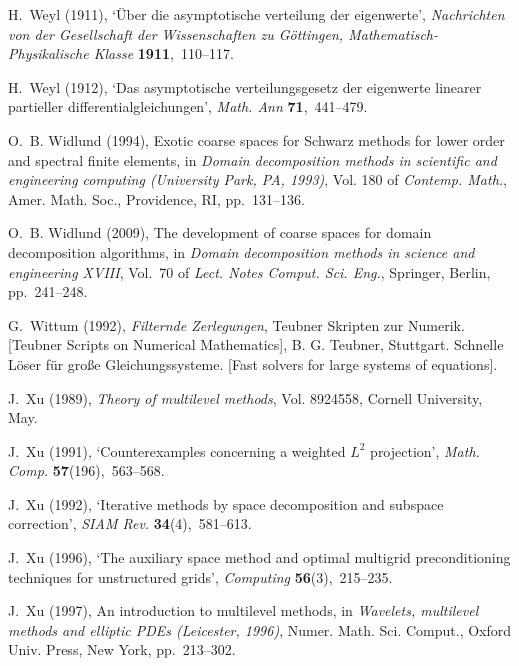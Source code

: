 \documentclass[12pt]{acta_2011xz}
\begin{document}
\begin{thebibliography}{xx}
H.~Weyl  (1911), `\"{U}ber die asymptotische verteilung der eigenwerte', {\em
  Nachrichten von der Gesellschaft der Wissenschaften zu G\"{o}ttingen,
  Mathematisch-Physikalische Klasse} {\bf 1911},~110--117.

H.~Weyl  (1912), `Das asymptotische verteilungsgesetz der eigenwerte linearer
  partieller differentialgleichungen', {\em Math. Ann} {\bf 71},~441--479.

O.~B. Widlund  (1994), Exotic coarse spaces for {S}chwarz methods for lower
  order and spectral finite elements, in {\em Domain decomposition methods in
  scientific and engineering computing ({U}niversity {P}ark, {PA}, 1993)}, Vol.
  180 of {\em Contemp. Math.}, Amer. Math. Soc., Providence, RI, pp.~131--136.

O.~B. Widlund  (2009), The development of coarse spaces for domain
  decomposition algorithms, in {\em Domain decomposition methods in science and
  engineering {XVIII}}, Vol.~70 of {\em Lect. Notes Comput. Sci. Eng.},
  Springer, Berlin, pp.~241--248.

G.~Wittum  (1992), {\em Filternde {Z}erlegungen}, Teubner Skripten zur Numerik.
  [Teubner Scripts on Numerical Mathematics], B. G. Teubner, Stuttgart.
\newblock Schnelle L{\"{o}}ser f{\"{u}}r gro{\ss}e Gleichungssysteme. [Fast solvers
  for large systems of equations].

J.~Xu  (1989), {\em Theory of multilevel methods}, Vol. 8924558, Cornell
  University, May.

J.~Xu  (1991), `Counterexamples concerning a weighted {        $L^2$        } projection', {\em
  Math. Comp.} {\bf 57}(196),~563--568.

J.~Xu  (1992), `Iterative methods by space decomposition and subspace
  correction', {\em SIAM Rev.} {\bf 34}(4),~581--613.

J.~Xu  (1996), `The auxiliary space method and optimal multigrid
  preconditioning techniques for unstructured grids', {\em Computing} {\bf
  56}(3),~215--235.

J.~Xu  (1997), An introduction to multilevel methods, in {\em Wavelets,
  multilevel methods and elliptic {PDE}s ({L}eicester, 1996)}, Numer. Math.
  Sci. Comput., Oxford Univ. Press, New York, pp.~213--302.


\end{thebibliography}
\end{document}

